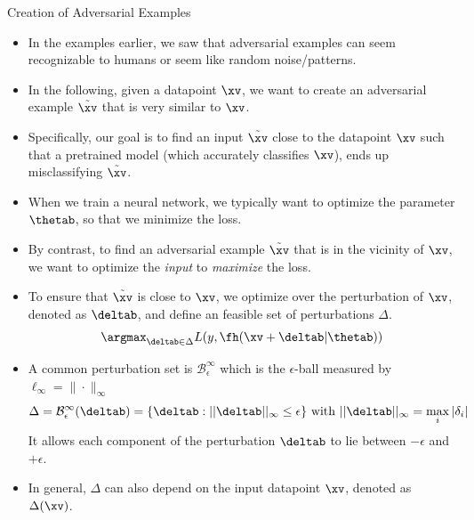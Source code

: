 \begin{vbframe} {Creation of Adversarial Examples}
  \begin{itemize}
  \item In the examples earlier, we saw that adversarial examples can seem recognizable to humans or seem like random noise/patterns.
  \item In the following, given a datapoint $\xv$, we want to create an adversarial example $\tilde{\xv}$ that is very similar to $\xv$. 
    \item Specifically, our goal is to find an input $\tilde{\xv}$ close to the datapoint $\xv$ such that a pretrained model (which accurately classifies $\xv$), ends up misclassifying $\tilde{\xv}$. 
    \item When we train a neural network, we typically want to optimize the parameter $\thetab$, so that we minimize the loss. 
    \item By contrast, to find an adversarial example $\tilde{\xv}$ that is in the vicinity of $\xv$, we want to optimize the \textit{input} to \textit{maximize} the loss.    \framebreak
    \item To ensure that $\tilde{\xv}$ is close to $\xv$, we optimize over the perturbation of $\xv$, denoted as $\deltab$, and define an feasible set of perturbations $\Delta$. 
    \begin{equation*}
        \argmax_{\deltab \in \Delta} L(y, \fh(\xv + \deltab| \thetab))
    \end{equation*}
    \item A common perturbation set is $\mathcal{B}^{\infty}_{\epsilon}$ which is the $\epsilon$-ball measured by $\ell_{\infty} = \|\cdot\|_{\infty}$
    \begin{equation*}
        \Delta = \mathcal{B}^{\infty}_{\epsilon}(\deltab) = \{\deltab: ||\deltab||_{\infty} \le \epsilon\} \text{ with } ||\deltab||_{\infty} = \max_i|\delta_i|
    \end{equation*}
    It allows each component of the perturbation $\deltab$ to lie between  $-\epsilon$ and $+ \epsilon$.
    \item In general, $\Delta$ can also depend on the input datapoint $\xv$, denoted as $\Delta(\xv)$.
  \end{itemize}
\end{vbframe}

